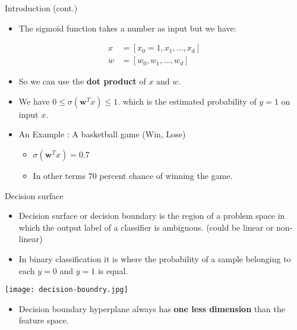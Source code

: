 \documentclass[serif, aspectratio=169]{beamer}
\begin{document}
\begin{frame}{Introduction (cont.)}
    \begin{itemize}
      \item The sigmoid function takes a number as input but we have:
    \end{itemize}
        \begin{align*}
            x &= [x_0=1,x_1, \dots, x_d] \\
            w &= [w_0, w_1, \dots, w_d]
        \end{align*}
    \begin{itemize} 
      \item So we can use the \textbf{dot product} of $x$ and $w$.
      
      \item We have $0\leq \sigma (\mathbf{w}^Tx) \leq 1$. which is the estimated probability of $y=1$ on input $x$.

      \item An Example : A basketball game (Win, Lose)
        \begin{itemize}
            \item $\sigma (\mathbf{w}^T x) = 0.7$
            \item In other terms $70$ percent chance of winning the game.
        \end{itemize}
        
    \end{itemize}
\end{frame}

\begin{frame}{Decision surface}
    \begin{itemize}
      \item Decision surface or decision boundary is the region of a problem space in which the output label of a classifier is ambiguous. (could be linear or non-linear)
      \item In binary classification it is where the probability of a sample belonging to each $y=0$ and $y=1$ is equal.
    \end{itemize}
    
     \begin{center}
        \texttt{[image: decision-boundry.jpg]}
    \end{center}
    
    \begin{itemize}
      \item Decision boundary hyperplane always has \textbf{one less dimension} than the feature space.
     
    \end{itemize}
\end{frame}
\end{document}
